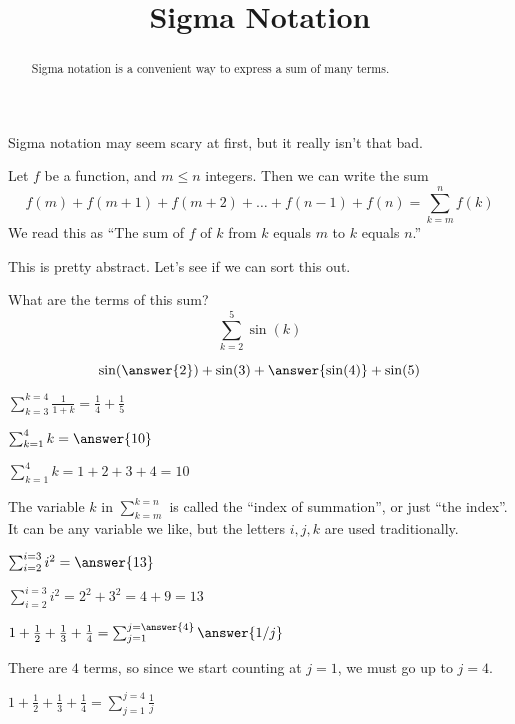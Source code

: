 \documentclass{ximera}
\title[Dig-In:]{Sigma Notation}
\begin{document}
\begin{abstract}
  Sigma notation is a convenient way to express a sum of many terms.
\end{abstract}


Sigma notation may seem scary at first, but it really isn't that bad.

\begin{definition}
  Let $f$ be a function, and $m \leq n$ integers.  Then we can write
  the sum
  \[
  f(m)+f(m+1)+f(m+2)+\dots+f(n-1)+f(n) = \sum_{k=m}^{n} f(k)
  \] 
  We read this as ``The sum of $f$ of $k$ from $k$ equals $m$ to
  $k$ equals $n$.''
\end{definition}

This is pretty abstract. Let's see if we can sort this out.


\begin{problem}
What are the terms of this sum?
  \[
  \sum_{k=2}^{5} \sin(k)
  \]
  \begin{prompt}
    \[
    \sin(\answer{2}) + \sin(3) + \answer{\sin(4)} + \sin(5)
    \]
  \end{prompt}
\end{problem}

\begin{example}
$\sum_{k=3}^{k=4} \frac{1}{1+k} = \frac{1}{4}+\frac{1}{5}$
\end{example}

\begin{question}
	$\sum_{k=1}^{4} k  = \answer{10}$
	\begin{hint}
		$\sum_{k=1}^{4} k  = 1+2+3+4=10$
	\end{hint}
\end{question}

The variable $k$ in $\sum_{k=m}^{k=n}$ is called the ``index of summation'', or just ``the index''.  It can be any variable we like, but the letters $i,j,k$ are used traditionally.

\begin{question}
$\sum_{i=2}^{i=3} i^2  = \answer{13}$
\begin{hint}
	$\sum_{i=2}^{i=3} i^2  = 2^2+3^2 = 4+9=13$
\end{hint}
\end{question}

\begin{question}
	$1+\frac{1}{2} + \frac{1}{3} + \frac{1}{4} = \sum_{j=1}^{j= \answer{4}} \answer{1/j}$
	\begin{hint}
		There are $4$ terms, so since we start counting at $j=1$, we must go up to $j=4$.
	\end{hint}
	\begin{hint}
		$1+\frac{1}{2} + \frac{1}{3} + \frac{1}{4} = \sum_{j=1}^{j= 4} \frac{1}{j}$
	\end{hint}
\end{question}
\end{document}
